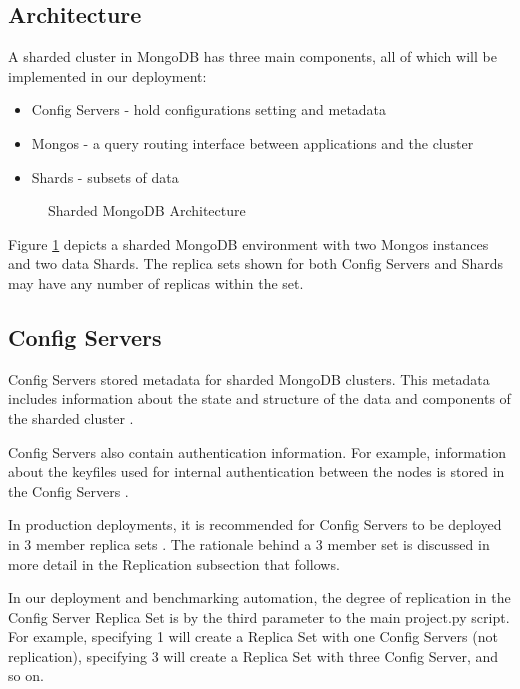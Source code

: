 \documentclass[9pt,twocolumn,twoside]{../../styles/osajnl}
\begin{document}
\subsection{Architecture}

A sharded cluster in MongoDB has three main components, all of which will be implemented in our deployment:

\begin{itemize}
\item Config Servers - hold configurations setting and metadata
\item Mongos - a query routing interface between applications and the cluster
\item Shards - subsets of data
\end{itemize}

\begin{figure}[htbp]
\centering
{}
\caption{Sharded MongoDB Architecture \cite{www-mongoComponents}}
\label{fig:mongodb-arch}
\end{figure}


Figure \ref{fig:mongodb-arch} depicts a sharded MongoDB environment with two Mongos instances and two data Shards.  The replica sets shown for both Config Servers and Shards may have any number of replicas within the set.

\subsection{Config Servers}

Config Servers stored metadata for sharded MongoDB clusters.  This metadata includes information about the state and structure of the data and components of the sharded cluster \cite{www-mongoConfig}.

Config Servers also contain authentication information.  For example, information about the keyfiles used for internal authentication between the nodes is stored in the Config Servers \cite{www-mongoConfig}.

In production deployments, it is recommended for Config Servers to be deployed in 3 member replica sets \cite{www-mongoComponents}.  The rationale behind a 3 member set is discussed in more detail in the Replication subsection that follows.

In our deployment and benchmarking automation, the degree of replication in the Config Server Replica Set is by the third parameter to the main project.py script.  For example, specifying 1 will create a Replica Set with one Config Servers (not replication), specifying 3 will create a Replica Set with three Config Server, and so on. 
\end{document}
